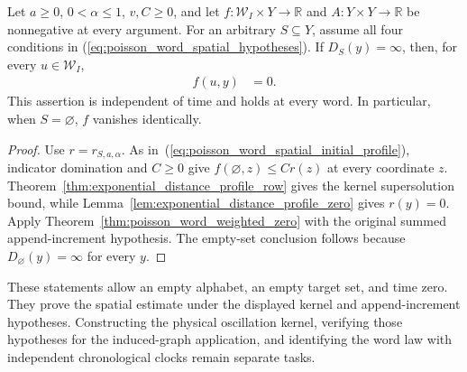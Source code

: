 \begin{theorem}
\label{thm:poisson_word_spatial_zero}
\leanok
{}
Let $a\geq0$, $0<\alpha\leq1$, $v,C\geq0$, and let
$f:\mathcal W_I\times Y\to\mathbb R$ and
$A:Y\times Y\to\mathbb R$ be nonnegative at every argument.
For an arbitrary $S\subseteq Y$, assume all four conditions in
(\ref{eq:poisson_word_spatial_hypotheses}).
If $D_S(y)=\infty$, then, for every $u\in\mathcal W_I$,
\begin{align}
 f(u,y)&=0.
 \label{eq:poisson_word_spatial_zero}
\end{align}
This assertion is independent of time and holds at every word.
In particular, when $S=\varnothing$, $f$ vanishes identically.
\end{theorem}
\begin{proof}
\leanok
{}
Use $r=r_{S,a,\alpha}$.
As in~(\ref{eq:poisson_word_spatial_initial_profile}), indicator
domination and $C\geq0$ give $f(\varnothing,z)\leq Cr(z)$ at
every coordinate $z$.
Theorem~\ref{thm:exponential_distance_profile_row} gives the kernel
supersolution bound, while
Lemma~\ref{lem:exponential_distance_profile_zero} gives $r(y)=0$.
Apply Theorem~\ref{thm:poisson_word_weighted_zero} with the original
summed append-increment hypothesis.  The empty-set conclusion follows
because $D_{\varnothing}(y)=\infty$ for every $y$.
\end{proof}

These statements allow an empty alphabet, an empty target set, and
time zero.  They prove the spatial estimate under the displayed
kernel and append-increment hypotheses.  Constructing the physical
oscillation kernel, verifying those hypotheses for the induced-graph
application, and identifying the word law with independent
chronological clocks remain separate tasks.
